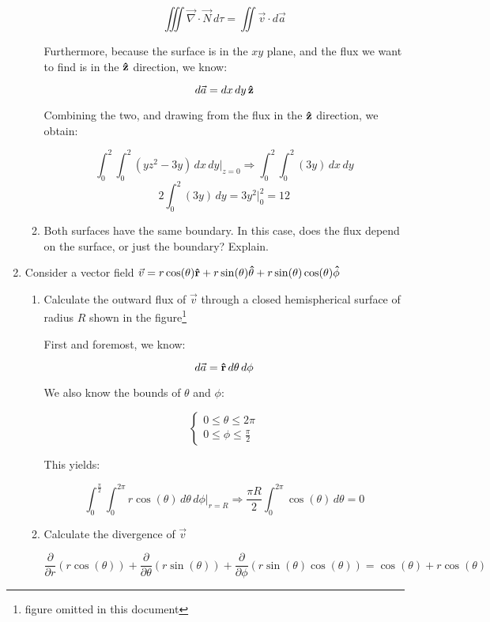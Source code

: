 \begin{enumerate}
\begin{enumerate}
        $$\iiint \vec{\nabla}\cdot\vec{N}\,d\tau=\iint\vec{v}\cdot d\vec{a}$$

        Furthermore, because the surface is in the $xy$ plane, and the flux we want to find is in the $\bold{\hat{z}}$ direction, we know:

        $$d\vec{a}=dx\,dy\,\bold{\hat{z}}$$

        Combining the two, and drawing from the flux in the $\bold{\hat{z}}$ direction, we obtain:

        $$\int_0^2\int_0^2 (yz^2-3y)\,dx\,dy\Big|_{z=0}\Rightarrow\int_0^2\int_0^2 (3y)\,dx\,dy$$
        $$\boxed{2\int_0^2 (3y)\,dy=3y^2\Big|_0^2=12}$$

      \item Both surfaces have the same boundary. In this case, does the flux depend on the surface, or just the boundary? Explain.

    \end{enumerate}

  \item Consider a vector field $\vec{v}=r\cos(\theta)\bold{\hat{r}}+r\sin(\theta)\bold{\hat{\theta}}+r\sin(\theta)\cos(\theta)\bold{\hat{\phi}}$

    \begin{enumerate}

      \item Calculate the outward flux of $\vec{v}$ through a closed hemispherical surface of radius $R$ shown in the figure\footnote{figure omitted in this document}

        First and foremost, we know:

        $$d\vec{a}=\bold{\hat{r}}\,d\theta\,d\phi$$

        We also know the bounds of $\theta$ and $\phi$:

        $$\left\{\begin{array}{l} 0\leq\theta\leq2\pi\\0\leq\phi\leq\frac{\pi}{2}\end{array}$$

          This yields:

          $$\int_0^{\frac{\pi}{2}}\int_0^{2\pi} r\cos(\theta)\,d\theta\,d\phi\Big|_{r=R}\Rightarrow\frac{\pi R}{2}\int_0^{2\pi} \cos(\theta)\,d\theta=0$$

      \item Calculate the divergence of $\vec{v}$

        $$\frac{\partial}{\partial r}(r\cos(\theta))+\frac{\partial}{\partial \theta}(r\sin(\theta))+\frac{\partial}{\partial \phi}(r\sin(\theta)\cos(\theta))=\cos(\theta)+r\cos(\theta)$$


\end{enumerate}
\end{enumerate}
